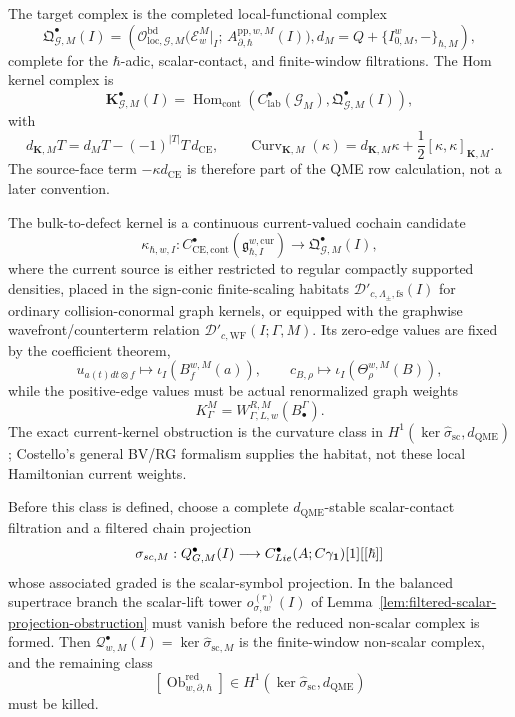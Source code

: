 \begin{enumerate}
  The target complex is the completed local-functional complex
  \[
    \mathfrak Q^\bullet_{\mathcal G,M}(I)
      =
    \left(
      \mathcal O_{\mathrm{loc},\mathcal G,M}^{\mathrm{bd}}\bigl(
        \mathcal E^M_w|_I;\,
        A^{\mathrm{pp},w,M}_{\partial,\hbar}(I)\bigr),
      d_M=Q+\{I^w_{0,M},-\}_{\hbar,M}
    \right),
  \]
  complete for the \(\hbar\)-adic, scalar-contact, and finite-window
  filtrations.  The Hom kernel complex is
  \[
    \mathbf K^\bullet_{\mathcal G,M}(I)
      =
    \operatorname{Hom}_{\mathrm{cont}}\!
    \left(C^\bullet_{\mathrm{lab}}(\mathcal G_M),
      \mathfrak Q^\bullet_{\mathcal G,M}(I)\right),
  \]
  with
  \[
    d_{\mathbf K,M}T
      =
    d_MT-(-1)^{|T|}T\,d_{\mathrm{CE}},
    \qquad
    \operatorname{Curv}_{\mathbf K,M}(\kappa)
      =
    d_{\mathbf K,M}\kappa+\frac12[\kappa,\kappa]_{\mathbf K,M}.
  \]
  The source-face term \(-\kappa d_{\mathrm{CE}}\) is therefore part of
  the QME row calculation, not a later convention.

  The bulk-to-defect kernel is a continuous current-valued cochain
  candidate
  \[
    \kappa_{\hbar,w,I}\colon
    C^\bullet_{\mathrm{CE},\mathrm{cont}}
    (\mathfrak g^{w,\mathrm{cur}}_{\hbar,I})
      \longrightarrow
    \mathfrak Q^\bullet_{\mathcal G,M}(I),
  \]
  where the current source is either restricted to regular compactly
  supported densities, placed in the sign-conic finite-scaling habitats
  \(\mathcal D'_{c,\Lambda_\pm,\mathrm{fs}}(I)\) for ordinary
  collision-conormal graph kernels, or equipped with the graphwise
  wavefront/counterterm relation
  \(\mathcal D'_{c,\mathrm{WF}}(I;\Gamma,M)\).  Its zero-edge values
  are fixed by the coefficient theorem,
  \[
    u_{a(t)dt\otimes f}\mapsto \iota_I(B^{w,M}_f(a)),
    \qquad
    c_{B,\rho}\mapsto\iota_I(\Theta^{w,M}_\rho(B)),
  \]
  while the positive-edge values must be actual renormalized graph
  weights
  \[
    K^M_\Gamma=W^{R,M}_{\Gamma,L,w}(B^\Gamma_\bullet).
  \]
  The exact current-kernel obstruction is the curvature class in
  \(H^1(\ker\widehat\sigma_{\mathrm{sc}},d_{\mathrm{QME}})\); Costello's
  general BV/RG formalism supplies the habitat, not these local
  Hamiltonian current weights.

  Before this class is defined, choose a complete
  \(d_{\mathrm{QME}}\)-stable scalar-contact filtration and a filtered
  chain projection
  \[
    \sigma_{sc,M}:
    Q^\bullet_{G,M}(I)
      \longrightarrow
    C^\bullet_{Lie}(A;C\gamma_{\mathbf 1})[1][[\hbar]]
  \]
  whose associated graded is the scalar-symbol projection.  In the
  balanced supertrace branch the scalar-lift tower
  \(o_{\sigma,w}^{(r)}(I)\) of
  Lemma~\ref{lem:filtered-scalar-projection-obstruction} must vanish
  before the reduced non-scalar complex is formed.  Then
  \(\mathcal Q^\bullet_{w,M}(I)=\ker\widehat\sigma_{\mathrm{sc},M}\)
  is the finite-window non-scalar complex, and the remaining class
  \[
    [\operatorname{Ob}^{\mathrm{red}}_{w,\partial,\hbar}]
      \in
    H^1(\ker\widehat\sigma_{\mathrm{sc}},d_{\mathrm{QME}})
  \]
  must be killed.


\end{enumerate}
